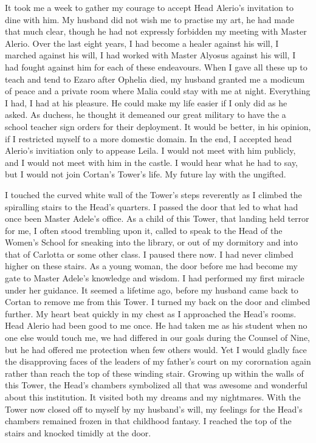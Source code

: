 \documentclass{article}
\begin{document}
It took me a week to gather my courage to accept Head Alerio's invitation to dine with him. My husband did not wish me to practise my art, he had made that much clear, though he had not expressly forbidden my meeting with Master Alerio. Over the last eight years, I had become a healer against his will, I marched against his will, I had worked with Master Alyosus against his will, I had fought against him for each of these endeavours. When I gave all these up to teach and tend to Ezaro after Ophelia died, my husband granted me a modicum of peace and a private room where Malia could stay with me at night. Everything I had, I had at his pleasure. He could make my life easier if I only did as he asked. As duchess, he thought it demeaned our great military to have the a school teacher sign orders for their deployment. It would be better, in his opinion, if I restricted myself to a more domestic domain. In the end, I accepted head Alerio's invitiation only to appease Leila. I would not meet with him publicly, and I would not meet with him in the castle. I would hear what he had to say, but I would not join Cortan's Tower's life. My future lay with the ungifted. 

I touched the curved white wall of the Tower's steps reverently as I climbed the spiralling stairs to the Head's quarters. I passed the door that led to what had once been Master Adele's office. As a child of this Tower, that landing held terror for me, I often stood trembling upon it, called to speak to the Head of the Women's School for sneaking into the library, or out of my dormitory and into that of Carlotta or some other class. I paused there now. I had never climbed higher on these stairs. As a young woman, the door before me had become my gate to Master Adele's knowledge and wisdom. I had performed my first miracle under her guidance. It seemed a lifetime ago, before my husband came back to Cortan to remove me from this Tower. I turned my back on the door and climbed further. My heart beat quickly in my chest as I approached the Head's rooms. Head Alerio had been good to me once. He had taken me as his student when no one else would touch me, we had differed in our goals during the Counsel of Nine, but he had offered me protection when few others would. Yet I would gladly face the disapproving faces of the leaders of my father's court on my corornation again rather than reach the top of these winding stair. Growing up within the walls of this Tower, the Head's chambers symbolized all that was awesome and wonderful about this institution. It visited both my dreams and my nightmares. With the Tower now closed off to myself by my husband's will, my feelings for the Head's chambers remained frozen in that childhood fantasy. I reached the top of the stairs and knocked timidly at the door.
\end{document}

